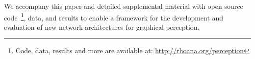 We accompany this paper and detailed supplemental material with open source code~\footnote{Code, data, results and more are available at: \url{http://rhoana.org/perception}}, data, and results to enable a framework for the development and evaluation of new network architectures for graphical perception.


%
%
%
%
%
%
%

